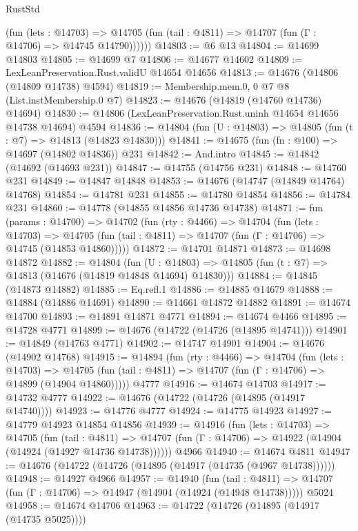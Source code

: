 \begin{lexlean}{RustStd}
\begin{coremodule}
          (fun (lets : @14703) =>
          @14705 (fun (tail : @4811) => @14707 (fun (Γ : @14706) => @14745 @14790))))))
@14803 := @6 @13
@14804 := @14699 @14803
@14805 := @14699 @7
@14806 := @14677 @14602
@14809 := LexLeanPreservation.Rust.validU @14654 @14656
@14813 := @14676 (@14806 (@14809 @14738) @4594)
@14819 := Membership.mem.{0, 0} @7 @8 (List.instMembership.{0} @7)
@14823 := @14676 (@14819 (@14760 @14736) @14694)
@14830 := @14806 (LexLeanPreservation.Rust.uninh @14654 @14656 @14738 @14694) @4594
@14836 := @14804 (fun (U : @14803) => @14805 (fun (t : @7) => @14813 (@14823 @14830)))
@14841 := @14675 (fun (fn : @100) => @14697 (@14802 @14836)) @231
@14842 := And.intro
@14845 := @14842 (@14692 (@14693 @231))
@14847 := @14755 (@14756 @231)
@14848 := @14760 @231
@14849 := @14847 @14848
@14853 := @14676 (@14747 (@14849 @14764) @14768)
@14854 := @14781 @231
@14855 := @14780 @14854
@14856 := @14784 @231
@14860 := @14778 (@14855 @14856 @14736 @14738)
@14871 := fun (params : @14700) =>
  @14702
    (fun (rty : @4466) =>
    @14704
      (fun (lets : @14703) =>
      @14705 (fun (tail : @4811) => @14707 (fun (Γ : @14706) => @14745 (@14853 @14860)))))
@14872 := @14701 @14871
@14873 := @14698 @14872
@14882 := @14804
    (fun (U : @14803) => @14805 (fun (t : @7) => @14813 (@14676 (@14819 @14848 @14694) @14830)))
@14884 := @14845 (@14873 @14882)
@14885 := Eq.refl.{1}
@14886 := @14885 @14679
@14888 := @14884 (@14886 @14691)
@14890 := @14661 @14872 @14882
@14891 := @14674 @14700
@14893 := @14891 @14871 @4771
@14894 := @14674 @4466
@14895 := @14728 @4771
@14899 := @14676 (@14722 (@14726 (@14895 @14741)))
@14901 := @14849 (@14763 @4771)
@14902 := @14747 @14901
@14904 := @14676 (@14902 @14768)
@14915 := @14894
    (fun (rty : @4466) =>
    @14704
      (fun (lets : @14703) =>
      @14705 (fun (tail : @4811) => @14707 (fun (Γ : @14706) => @14899 (@14904 @14860)))))
    @4777
@14916 := @14674 @14703
@14917 := @14732 @4777
@14922 := @14676 (@14722 (@14726 (@14895 (@14917 @14740))))
@14923 := @14776 @4777
@14924 := @14775 @14923
@14927 := @14779 @14923 @14854 @14856
@14939 := @14916
    (fun (lets : @14703) =>
    @14705
      (fun (tail : @4811) =>
      @14707 (fun (Γ : @14706) => @14922 (@14904 (@14924 (@14927 @14736 @14738))))))
    @4966
@14940 := @14674 @4811
@14947 := @14676 (@14722 (@14726 (@14895 (@14917 (@14735 (@4967 @14738))))))
@14948 := @14927 @4966
@14957 := @14940
    (fun (tail : @4811) => @14707 (fun (Γ : @14706) => @14947 (@14904 (@14924 (@14948 @14738)))))
    @5024
@14958 := @14674 @14706
@14963 := @14722 (@14726 (@14895 (@14917 (@14735 @5025))))

\end{coremodule}
\end{lexlean}
